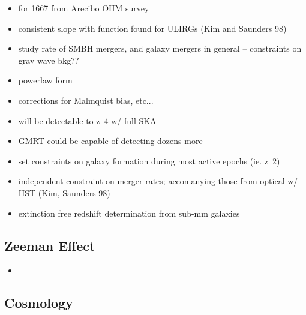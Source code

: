 \begin{itemize}
\item for 1667 from Arecibo OHM survey
\item consistent slope with function found for ULIRGs (Kim and Saunders 98)
\item study rate of SMBH mergers, and galaxy mergers in general -- constraints on grav wave bkg??
\item powerlaw form
\item corrections for Malmquist bias, etc...
\item will be detectable to z~4 w/ full SKA
\item GMRT could be capable of detecting dozens more
\item set constraints on galaxy formation during most active epochs (ie. z~2)
\item independent constraint on merger rates; accomanying those from optical w/ HST (Kim, Saunders 98)
\item extinction free redshift determination from sub-mm galaxies
\end{itemize}

\subsection{Zeeman Effect}

\begin{itemize}
\item 
\end{itemize}

\subsection{Cosmology}